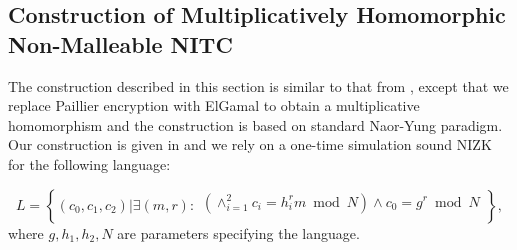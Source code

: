 \subsection{Construction of Multiplicatively Homomorphic Non-Malleable NITC}

The construction described in this section is similar to that from , except that we replace Paillier encryption with ElGamal to obtain a multiplicative homomorphism and the construction is based on standard Naor-Yung paradigm. %
Our construction is given in  and we rely on a one-time simulation sound NIZK for the following language: 

\[
L = \left\{(c_0, c_1, c_2)| \exists (m,r):
\begin{aligned}
       (\land_{i=1}^2 c_i = h_i^{r}m \bmod N) \land
       c_0 = g^r \bmod N\\
    \end{aligned}
    \right\}, 
\]
where $g, h_1, h_2, N$ are parameters specifying the language.



